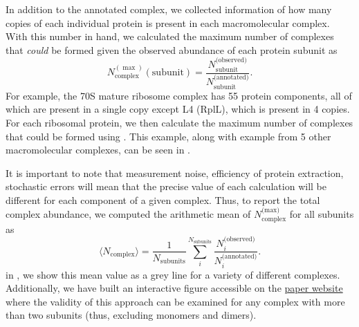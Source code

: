 In addition to the annotated complex, we collected information of how many
copies of each individual protein is present in each macromolecular complex.
With this number in hand, we calculated the maximum number of complexes that
\textit{could} be formed given the observed abundance of each protein subunit as 
\begin{equation}
    N_\text{complex}^{(\max)}(\text{subunit}) = \frac{N_\text{subunit}^\text{(observed)}}{N_\text{subunit}^\text{(annotated)}}.
    \label{eq:subunit_max}
\end{equation}
For example, the 70S mature ribosome complex has 55 protein components, all of
which are present in a single copy except L4 (RplL), which is present in 4
copies. For each ribosomal protein, we then calculate the  maximum number of
complexes that could be formed using . This example, along with
example from 5 other macromolecular complexes, can be seen in
.

It is important to note that measurement noise, efficiency of protein
extraction, stochastic errors will mean that the precise value of each
calculation will be different for each component of a given complex. Thus, to
report the total complex abundance, we computed the arithmetic mean of
$N_\text{complex}^\text{(max)}$ for all subunits as 
\begin{equation}
   \langle N_\text{complex} \rangle = \frac{1}{N_\text{subunits}}\sum\limits_i^{N_\text{subunits}} \frac{N_{i}^\text{(observed)}}{N_{i}^\text{(annotated)}}.
   \label{eq:complex_count}
\end{equation}
in , we show this mean value as a grey line for a variety
of different complexes. Additionally, we have built an interactive figure
accessible on the \href{https://www.rpgroup.caltech.edu/growth_limits}{paper
website} where the validity of this approach can be examined for any complex
with more than two subunits (thus, excluding monomers and dimers). 

